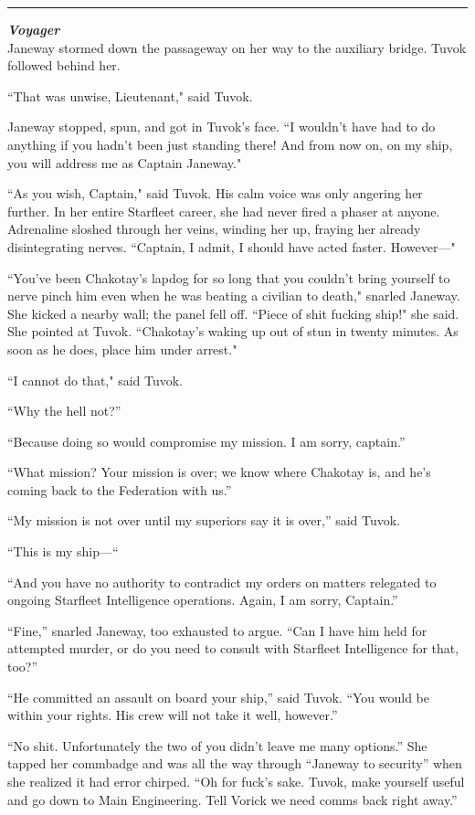 \documentclass[twoside,letterpaper,12pt]{memoir}
\begin{document}
\fancybreak{\rule{3cm}{0.4 pt}}
\noindent\textit{\textbf{Voyager}}\\

Janeway stormed down the passageway on her way to the auxiliary bridge. Tuvok followed behind her.

``That was unwise, Lieutenant," said Tuvok.

Janeway stopped, spun, and got in Tuvok's face. ``I wouldn't have had to do anything if you hadn't been just standing there! And from now on, on my ship, you will address me as Captain Janeway."

``As you wish, Captain," said Tuvok. His calm voice was only angering her further. In her entire Starfleet career, she had never fired a phaser at anyone. Adrenaline sloshed through her veins, winding her up, fraying her already disintegrating nerves. ``Captain, I admit, I should have acted faster. However---"

``You've been Chakotay's lapdog for so long that you couldn't bring yourself to nerve pinch him even when he was beating a civilian to death," snarled Janeway. She kicked a nearby wall; the panel fell off. ``Piece of shit fucking ship!" she said. She pointed at Tuvok. ``Chakotay's waking up out of stun in twenty minutes. As soon as he does, place him under arrest."

``I cannot do that," said Tuvok.

``Why the hell not?''

``Because doing so would compromise my mission. I am sorry, captain.''

``What mission? Your mission is over; we know where Chakotay is, and he’s coming back to the Federation with us.''

``My mission is not over until my superiors say it is over,'' said Tuvok.

``This is my ship—``

``And you have no authority to contradict my orders on matters relegated to ongoing Starfleet Intelligence operations. Again, I am sorry, Captain.''

``Fine,'' snarled Janeway, too exhausted to argue. ``Can I have him held for attempted murder, or do you need to consult with Starfleet Intelligence for that, too?''

``He committed an assault on board your ship,'' said Tuvok. ``You would be within your rights. His crew will not take it well, however.''

``No shit. Unfortunately the two of you didn’t leave me many options.'' She tapped her commbadge and was all the way through ``Janeway to security'' when she realized it had error chirped. ``Oh for fuck's sake. Tuvok, make yourself useful and go down to Main Engineering. Tell Vorick we need comms back right away.''
\end{document}

